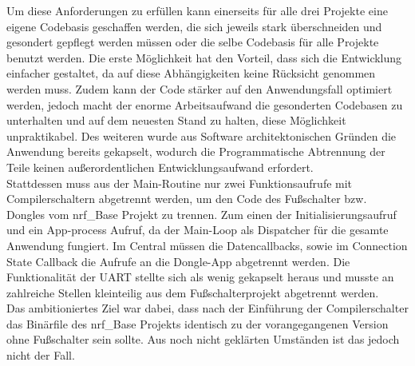 Um diese Anforderungen zu erfüllen kann einerseits für alle drei Projekte eine eigene Codebasis geschaffen werden, die sich jeweils stark überschneiden und gesondert gepflegt werden müssen oder die selbe Codebasis für alle Projekte benutzt werden. Die erste Möglichkeit hat den Vorteil, dass sich die Entwicklung einfacher gestaltet, da auf diese Abhängigkeiten keine Rücksicht genommen werden muss. Zudem kann der Code stärker auf den Anwendungsfall optimiert werden, jedoch macht der enorme Arbeitsaufwand die gesonderten Codebasen zu unterhalten und auf dem neuesten Stand zu halten, diese Möglichkeit unpraktikabel. Des weiteren wurde aus Software architektonischen Gründen die Anwendung bereits gekapselt, wodurch die Programmatische Abtrennung der Teile keinen außerordentlichen Entwicklungsaufwand erfordert.\\
Stattdessen muss aus der Main-Routine nur zwei Funktionsaufrufe mit Compilerschaltern abgetrennt werden, um den Code des Fußschalter bzw. Dongles vom nrf\_Base Projekt zu trennen. Zum einen der Initialisierungsaufruf und ein App-process Aufruf, da der Main-Loop als Dispatcher für die gesamte Anwendung fungiert. Im Central müssen die Datencallbacks, sowie im Connection State Callback die Aufrufe an die Dongle-App abgetrennt werden. Die Funktionalität der UART stellte sich als wenig gekapselt heraus und musste an zahlreiche Stellen kleinteilig aus dem Fußschalterprojekt abgetrennt werden.\\ 
Das ambitioniertes Ziel war dabei, dass nach der Einführung der Compilerschalter das Binärfile des nrf\_Base Projekts identisch zu der vorangegangenen Version ohne Fußschalter sein sollte. Aus noch nicht geklärten Umständen ist das jedoch nicht der Fall.


